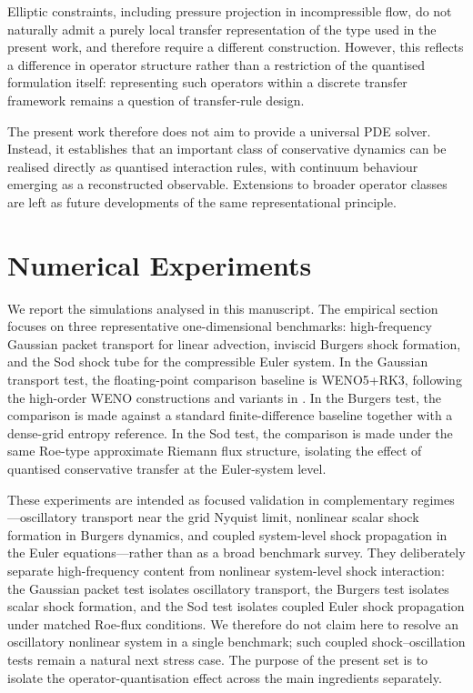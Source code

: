 \documentclass[sn-basic]{sn-jnl}
\theoremstyle{plain}
\theoremstyle{remark}
\begin{document}
Elliptic constraints, including pressure projection in incompressible flow, do not naturally admit a purely local transfer representation of the type used in the present work, and therefore require a different construction. However, this reflects a difference in operator structure rather than a restriction of the quantised formulation itself: representing such operators within a discrete transfer framework remains a question of transfer-rule design.

The present work therefore does not aim to provide a universal PDE solver. Instead, it establishes that an important class of conservative dynamics can be realised directly as quantised interaction rules, with continuum behaviour emerging as a reconstructed observable. Extensions to broader operator classes are left as future developments of the same representational principle.

\section{Numerical Experiments}
\label{sec:numerics}

We report the simulations analysed in this manuscript. The empirical section focuses on three representative one-dimensional benchmarks: high-frequency Gaussian packet transport for linear advection, inviscid Burgers shock formation, and the Sod shock tube for the compressible Euler system. In the Gaussian transport test, the floating-point comparison baseline is WENO5+RK3, following the high-order WENO constructions and variants in \cite{haModifiedEssentiallyNonoscillatory2013,haSixthorderWeightedEssentially2016,haImprovingAccuracyFifthOrder2021,zhuNewTypeMultiresolution2019,sungTroubledcellIndicatorBased2020}. In the Burgers test, the comparison is made against a standard finite-difference baseline together with a dense-grid entropy reference. In the Sod test, the comparison is made under the same Roe-type approximate Riemann flux structure, isolating the effect of quantised conservative transfer at the Euler-system level.

These experiments are intended as focused validation in complementary regimes---oscillatory transport near the grid Nyquist limit, nonlinear scalar shock formation in Burgers dynamics, and coupled system-level shock propagation in the Euler equations---rather than as a broad benchmark survey. They deliberately separate high-frequency content from nonlinear system-level shock interaction: the Gaussian packet test isolates oscillatory transport, the Burgers test isolates scalar shock formation, and the Sod test isolates coupled Euler shock propagation under matched Roe-flux conditions. We therefore do not claim here to resolve an oscillatory nonlinear system in a single benchmark; such coupled shock--oscillation tests remain a natural next stress case. The purpose of the present set is to isolate the operator-quantisation effect across the main ingredients separately.
\end{document}
